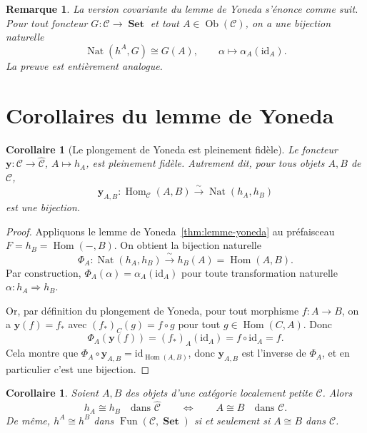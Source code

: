 \documentclass[a4paper,12pt]{book}
\DeclareMathOperator{\Hom}{Hom}
\DeclareMathOperator{\Ob}{Ob}
\DeclareMathOperator{\Fun}{Fun}
\DeclareMathOperator{\Nat}{Nat}
\DeclareMathOperator{\Set}{\mathbf{Set}}
\newcommand{\id}{\mathrm{id}}
\newtheorem{corollaire}[theoreme]{Corollaire}
\newtheorem*{remarque}{Remarque}
\begin{document}
\begin{remarque}\label{rem:yoneda-covariant}
La version \emph{covariante} du lemme de Yoneda s'énonce comme suit.
Pour tout foncteur $G \colon \mathcal{C} \to \Set$ et tout
$A \in \Ob(\mathcal{C})$, on a une bijection naturelle
\[
    \Nat(h^A, G) \cong G(A),
    \qquad \alpha \mapsto \alpha_A(\id_A).
\]
La preuve est entièrement analogue.
\end{remarque}


\section{Corollaires du lemme de Yoneda}\label{sec:yoneda-corollaires}

\begin{corollaire}[Le plongement de Yoneda est pleinement fidèle]%
\label{cor:yoneda-pleinement-fidele}
Le foncteur $\mathbf{y} \colon \mathcal{C} \to \widehat{\mathcal{C}}$,
$A \mapsto h_A$, est pleinement fidèle.
Autrement dit, pour tous objets $A, B$ de $\mathcal{C}$,
\[
    \mathbf{y}_{A,B} \colon \Hom_{\mathcal{C}}(A, B)
    \xrightarrow{\;\sim\;} \Nat(h_A, h_B)
\]
est une bijection.
\end{corollaire}

\begin{proof}
Appliquons le lemme de Yoneda~\ref{thm:lemme-yoneda} au préfaisceau
$F = h_B = \Hom(-, B)$. On obtient la bijection naturelle
\[
    \Phi_A \colon \Nat(h_A, h_B) \xrightarrow{\;\sim\;} h_B(A) = \Hom(A, B).
\]
Par construction, $\Phi_A(\alpha) = \alpha_A(\id_A)$ pour toute
transformation naturelle $\alpha \colon h_A \Rightarrow h_B$.

Or, par définition du plongement de Yoneda, pour tout morphisme
$f \colon A \to B$, on a $\mathbf{y}(f) = f_*$ avec
$(f_*)_C(g) = f \circ g$ pour tout $g \in \Hom(C, A)$.
Donc
\[
    \Phi_A(\mathbf{y}(f)) = (f_*)_A(\id_A) = f \circ \id_A = f.
\]
Cela montre que $\Phi_A \circ \mathbf{y}_{A,B} = \id_{\Hom(A,B)}$,
donc $\mathbf{y}_{A,B}$ est l'inverse de $\Phi_A$, et en particulier
c'est une bijection.
\end{proof}

\begin{corollaire}\label{cor:h-iso-implique-iso}
Soient $A, B$ des objets d'une catégorie localement petite $\mathcal{C}$.
Alors
\[
    h_A \cong h_B \quad \text{dans } \widehat{\mathcal{C}}
    \qquad \Longleftrightarrow \qquad
    A \cong B \quad \text{dans } \mathcal{C}.
\]
De même, $h^A \cong h^B$ dans $\Fun(\mathcal{C}, \Set)$
si et seulement si $A \cong B$ dans $\mathcal{C}$.
\end{corollaire}
\end{document}
